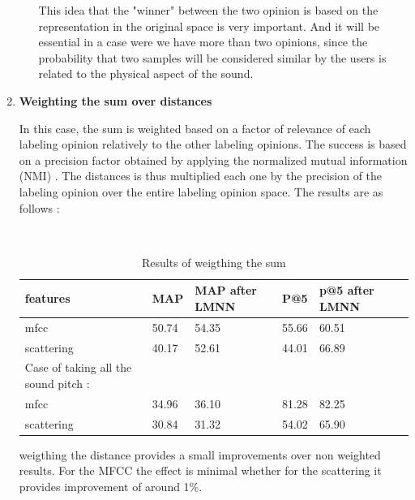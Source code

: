 \documentclass[hidelinks,12pt]{report}
\begin{document}
\begin{enumerate}
\begin{enumerate}
This idea that the "winner" between the two opinion is based on the representation in the original space is very important. And it will be essential in a case were we have more than two opinions, since the probability that two samples will be considered similar by the users is related to the physical aspect of the sound. 
 \end{enumerate}
 \item \textbf{Weighting the sum over distances} \par 
In this case, the sum is weighted based on a factor of relevance of each labeling opinion relatively to the other labeling opinions. The success is based on a precision factor obtained by applying the normalized mutual information (NMI) \cite{K03}. The distances is thus  multiplied each one by the precision of the labeling opinion over the entire labeling opinion space. The results are as follows :
\begin{table} [H]
\begin{center} 
\ 
 \setlength{\tabcolsep}{.16667em} 
\begin{tabular}{ | l | l | l | l | l | l |}
\hline
features & MAP & MAP after LMNN & P@5 & p@5 after LMNN  \\ 
\hline 
mfcc & 50.74& 54.35 & 55.66 & 60.51  \\ 
scattering & 40.17 & 52.61 & 44.01 & 66.89   \\
\hline Case of taking all the sound pitch :
\\
\hline
mfcc  & 34.96  & 36.10 & 81.28  & 82.25 \\
scattering & 30.84  & 31.32 & 54.02  & 65.90 \\

\hline
\end{tabular} 
\end{center} 
\caption{Results of weigthing the sum} 
\label{you} 
\end{table} 
 
 weigthing the distance provides a small improvements over non weighted results. For the MFCC the effect is minimal whether for the scattering it provides improvement of around 1\%.
 

\end{enumerate}
\end{document}
